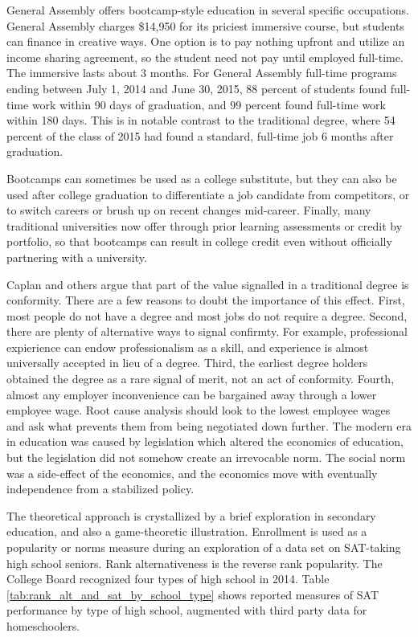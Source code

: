 \documentclass[AER]{./aea-latex-templates/AEA}
\begin{document}
General Assembly offers bootcamp-style education in several specific occupations. General Assembly
charges \$14,950 for its priciest immersive course, but students
can finance in creative ways. One option is to pay nothing upfront and utilize an income sharing
agreement, so the student need not pay until employed full-time\cite{ga2019}.
The immersive lasts about 3 months. For General Assembly
full-time programs ending between July 1, 2014 and June 30, 2015, 88 percent of students found full-time
work within 90 days of graduation, and 99 percent found full-time work within 180
days\cite{kirkham_2017}. This is in notable contrast to the traditional degree, where 54 percent of
the class of 2015 had found a standard, full-time job 6 months after
graduation\cite{wexler_2016}.

Bootcamps can sometimes be used as a college substitute, but they can also
be used after college graduation to differentiate a job candidate from
competitors, or to switch careers or brush up on recent changes
mid-career. Finally, many traditional universities now offer through prior
learning assessments or credit by portfolio, so that bootcamps can result
in college credit even without officially partnering with a university\cite{aceposttraditionallearners}.

Caplan and others argue that part of the value signalled in a traditional degree is conformity. There
are a few reasons to doubt the importance of this effect. First, most people do not have a degree and most jobs
do not require a degree. Second, there are plenty of alternative ways to signal confirmty. For example, professional expierience
can endow professionalism as a skill, and experience is almost universally accepted in lieu of a degree.
Third, the earliest degree holders obtained the degree as a rare signal of merit, not an act of
conformity. Fourth, almost any employer inconvenience can be bargained away through a lower employee
wage. Root cause analysis should look to the lowest employee wages and ask what prevents them from
being negotiated down further. The modern era in education was caused by legislation which altered the economics of education,
but the legislation did not somehow create an irrevocable norm. The social norm was a side-effect of the economics, and the economics
move with eventually independence from a stabilized policy.

The theoretical approach is crystallized by a brief exploration in
secondary education, and also a game-theoretic illustration. Enrollment is used as
a popularity or norms measure during an exploration of a data set on SAT-taking
high school seniors. Rank alternativeness is the reverse rank popularity. The College Board recognized four types of high
school in 2014\cite{collegeboard_2014}. Table \ref{tab:rank_alt_and_sat_by_school_type} shows reported measures of SAT performance by type of
high school, augmented with third party data for homeschoolers\cite{mullins_2016}.
\end{document}
